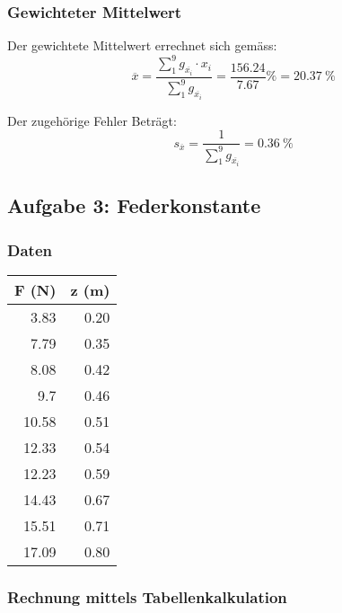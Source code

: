 \subsubsection{Gewichteter Mittelwert}

Der gewichtete Mittelwert errechnet sich gem\"ass:
\begin{equation}
    \overline{x} = \frac{\sum_1^9 g_{\overline{x_i}} \cdot x_i}{\sum_1^9 g_{\overline{x_i}}} = \frac{156.24}{7.67} \si{\percent} = \SI{20.37}{\percent}
\end{equation}

Der zugeh\"orige Fehler Betr\"agt:
\begin{equation}
    s_{\overline{x}} = \frac{1}{\sum_1^9 g_{\overline{x_i}}} = \SI{0.36}{\percent}
\end{equation}


\clearpage
\subsection{Aufgabe 3: Federkonstante}

\subsubsection{Daten}

\begin{center}
\begin{tabular}{rr}
    \toprule
    F (N) & z (m) \\
    \midrule
    3.83  & 0.20 \\
    7.79  & 0.35 \\
    8.08  & 0.42 \\
    9.7   & 0.46 \\
    10.58 & 0.51 \\
    12.33 & 0.54 \\
    12.23 & 0.59 \\
    14.43 & 0.67 \\
    15.51 & 0.71 \\
    17.09 & 0.80 \\
    \bottomrule
\end{tabular}
\end{center}

\subsubsection{Rechnung mittels Tabellenkalkulation}

